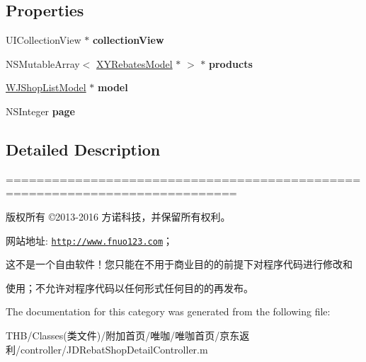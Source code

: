\subsection*{Properties}
\begin{DoxyCompactItemize}
\item 
\mbox{\label{category_j_d_rebat_shop_detail_controller_07_08_a3d61a03a26435b0b30f248cc4ddcdd35}} 
U\+I\+Collection\+View $\ast$ {\bfseries collection\+View}
\item 
\mbox{\label{category_j_d_rebat_shop_detail_controller_07_08_aacafd4b5d907a5e568fdb34da8ec0f3c}} 
N\+S\+Mutable\+Array$<$ \mbox{\hyperlink{interface_x_y_rebates_model}{X\+Y\+Rebates\+Model}} $\ast$ $>$ $\ast$ {\bfseries products}
\item 
\mbox{\label{category_j_d_rebat_shop_detail_controller_07_08_aed0222a5a4428e7b677990ceeafeaf0c}} 
\mbox{\hyperlink{interface_w_j_shop_list_model}{W\+J\+Shop\+List\+Model}} $\ast$ {\bfseries model}
\item 
\mbox{\label{category_j_d_rebat_shop_detail_controller_07_08_ad768ca08afb92b15764fa2120a801abf}} 
N\+S\+Integer {\bfseries page}
\end{DoxyCompactItemize}


\subsection{Detailed Description}
============================================================================

版权所有 ©2013-\/2016 方诺科技，并保留所有权利。

网站地址\+: \href{http://www.fnuo123.com}{\tt http\+://www.\+fnuo123.\+com}； 



这不是一个自由软件！您只能在不用于商业目的的前提下对程序代码进行修改和

使用；不允许对程序代码以任何形式任何目的的再发布。 

 

The documentation for this category was generated from the following file\+:\begin{DoxyCompactItemize}
\item 
T\+H\+B/\+Classes(类文件)/附加首页/唯咖/唯咖首页/京东返利/controller/J\+D\+Rebat\+Shop\+Detail\+Controller.\+m\end{DoxyCompactItemize}
